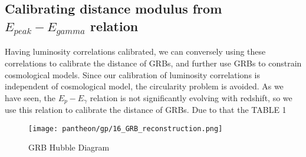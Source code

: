 \subsection{Calibrating distance modulus from $E_{peak}-E_{gamma}$ relation}
Having luminosity correlations calibrated, we can conversely using these correlations to calibrate the distance of GRBs, and further use GRBs to constrain cosmological models. Since our calibration of luminosity correlations is independent of cosmological model, the circularity problem is avoided. As we have seen, the $E_{p}-E_{\gamma}$ relation is not significantly evolving with redshift, so we use this relation to calibrate the distance of GRBs. Due to that the TABLE 1
\begin{figure}[H]
	\centering
	\texttt{[image: pantheon/gp/16\_GRB\_reconstruction.png]}
	\caption{GRB Hubble Diagram}
	\label{fig:HD_GRB_GP}
\end{figure}